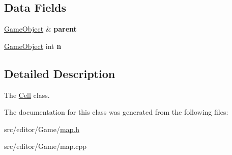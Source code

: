 \subsection*{\-Data \-Fields}
\begin{DoxyCompactItemize}
\item 
\hypertarget{class_cell_a43eede8611f015425717b487363ac6ce}{\hyperlink{class_game_object}{\-Game\-Object} \& {\bfseries parent}}\label{class_cell_a43eede8611f015425717b487363ac6ce}

\item 
\hypertarget{class_cell_ad2e41db325c0c70d969c98a3f90776a2}{\hyperlink{class_game_object}{\-Game\-Object} int {\bfseries n}}\label{class_cell_ad2e41db325c0c70d969c98a3f90776a2}

\end{DoxyCompactItemize}


\subsection{\-Detailed \-Description}
\-The \hyperlink{class_cell}{\-Cell} class. 

\-The documentation for this class was generated from the following files\-:\begin{DoxyCompactItemize}
\item 
src/editor/\-Game/\hyperlink{map_8h}{map.\-h}\item 
src/editor/\-Game/map.\-cpp\end{DoxyCompactItemize}
